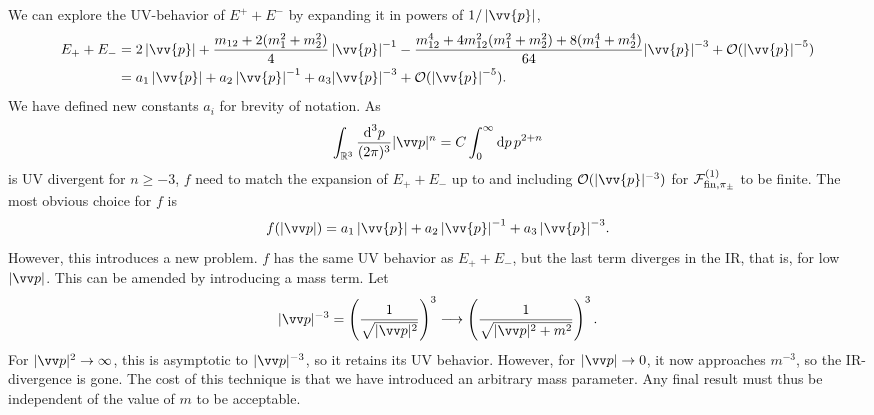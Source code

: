 We can explore the UV-behavior of $E^+ + E^-$ by expanding it in powers of $1 / \abs{\vv{p}}$,
%
\begin{align}
    \nonumber
    E_+ + E_-
    & = 
    2  \abs{\vv{p}}
    + \frac{m_{12} + 2(m_1^2 + m_2^2)}{4} \, {\abs{\vv{p}}}^{-1}
    - \frac{m_{12}^4 + 4 m_{12}^2(m_1^2 + m_2^2) + 8(m_1^4 + m_2^4)}{64}
    {\abs{\vv{p}}}^{-3}
    + \Oh (\abs{\vv{p}}^{-5})
    \\
    & = 
    a_1  \abs{\vv{p}}
    + a_2 \, {\abs{\vv{p}}}^{-1}
    + a_3
    {\abs{\vv{p}}}^{-3}
    + \Oh (\abs{\vv{p}}^{-5}).
\end{align}
%
We have defined new constants $a_i$ for brevity of notation.
As
%
\begin{equation}
    \int_{\R^3} \frac{\dd^3 p}{(2 \pi)^3} |\vv p|^{n}
    = C \int_{0}^\infty \dd p \, p^{2 + n}
\end{equation}
%
is UV divergent for $n \geq -3$, $f$ need to match the expansion of $E_+ + E_-$ up to and including $\Oh(|\vv{p}|^{-3})$ for $\mathcal{F}^{(1)}_{\mathrm{fin}, \pi_\pm }$ to be finite.
The most obvious choice for $f$ is
%
\begin{equation}
    f(|\vv p|) 
    = a_1  \abs{\vv{p}} + a_2 \, {\abs{\vv{p}}}^{-1} + a_3 \, {\abs{\vv{p}}}^{-3}.
\end{equation}
%
However, this introduces a new problem.
$f$ has the same UV behavior as $E_+ + E_-$, but the last term diverges in the IR, that is, for low $|\vv p|$.
This can be amended by introducing a mass term.
Let
%
\begin{equation}
    |\vv p|^{-3} 
    = 
    \left(\frac{1}{\sqrt{|\vv p|^2}}\right)^3 
    \longrightarrow 
    \left(\frac{1}{\sqrt{|\vv p|^2 + m^2}}\right)^3.
\end{equation}
%
For $|\vv p|^2 \rightarrow \infty$, this is asymptotic to $|\vv p|^{-3}$, so it retains its UV behavior.
However, for $|\vv p| \rightarrow 0$, it now approaches $m^{-3}$, so the IR-divergence is gone.
The cost of this technique is that we have introduced an arbitrary mass parameter.
Any final result must thus be independent of the value of $m$ to be acceptable.

